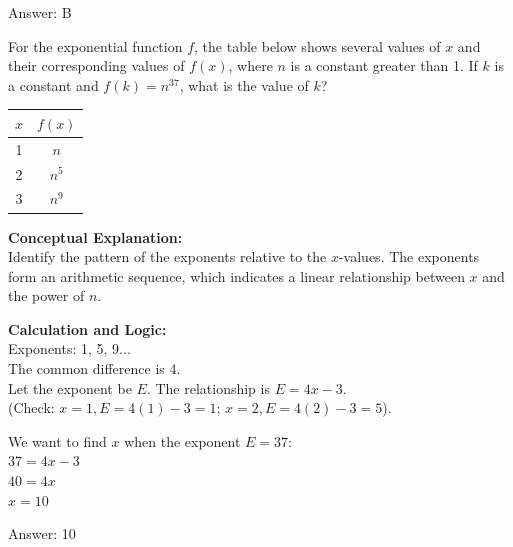 \documentclass[11pt,paper=a4,answers]{exam}
\begin{document}
\begin{questions}
\begin{solution}
\vspace{25pt}

Answer: \colorbox{yellow!100}{B}
\end{solution}

\vspace{40pt}

\question
For the exponential function $f$, the table below shows several values of $x$ and their corresponding values of $f(x)$, where $n$ is a constant greater than 1. If $k$ is a constant and $f(k) = n^{37}$, what is the value of $k$?
\begin{center}
\begin{tabular}{|c|c|}
\hline
$x$ & $f(x)$ \\ \hline
1 & $n$ \\ \hline
2 & $n^5$ \\ \hline
3 & $n^9$ \\ \hline
\end{tabular}
\end{center}

\begin{solution}
\textbf{Conceptual Explanation:} \\
Identify the pattern of the exponents relative to the $x$-values. The exponents form an arithmetic sequence, which indicates a linear relationship between $x$ and the power of $n$.

\vspace{20pt}

\textbf{Calculation and Logic:} \\
Exponents: 1, 5, 9... \\
The common difference is 4. \\
Let the exponent be $E$. The relationship is $E = 4x - 3$. \\
(Check: $x=1, E=4(1)-3=1$; $x=2, E=4(2)-3=5$).

\vspace{10pt}

We want to find $x$ when the exponent $E = 37$: \\
$37 = 4x - 3$ \\
$40 = 4x$ \\
$x = 10$

\vspace{25pt}

Answer: \colorbox{yellow!100}{10}
\end{solution}

\vspace{40pt}


\end{questions}
\end{document}
